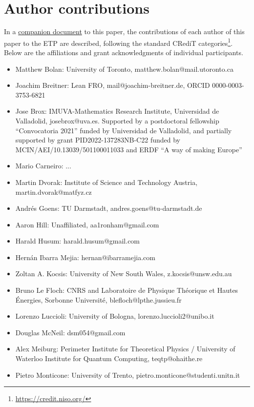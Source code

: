 \section{Author contributions}

In a \href{https://github.com/teorth/equational_theories/blob/main/paper/contributions.md}{companion document} to this paper, the contributions of each author of this paper to the ETP are described, following the standard CRediT categories\footnote{\url{https://credit.niso.org/}}.  Below are the affiliations and grant acknowledgments of individual participants.


\begin{itemize}
    \item Matthew Bolan: University of Toronto, matthew.bolan@mail.utoronto.ca
    \item Joachim Breitner: Lean FRO, mail@joachim-breitner.de, ORCID 0000-0003-3753-6821
    \item Jose Brox: IMUVA-Mathematics Research Institute, Universidad de Valladolid, josebrox@uva.es. Supported by a postdoctoral fellowship “Convocatoria 2021” funded by Universidad de Valladolid, and partially supported by grant PID2022-137283NB-C22 funded by MCIN/AEI/10.13039/501100011033 and ERDF “A way of making Europe”
    \item Mario Carneiro: ...
    \item Martin Dvorak: Institute of Science and Technology Austria, martin.dvorak@matfyz.cz
    \item Andr\'es Goens: TU Darmstadt, andres.goens@tu-darmstadt.de
    \item Aaron Hill: Unaffiliated, aa1ronham@gmail.com
    \item Harald Husum: harald.husum@gmail.com
    \item Hern\'an Ibarra Mejia: hernan@ibarramejia.com
    \item Zoltan A. Kocsis: University of New South Wales, z.kocsis@unsw.edu.au
    \item Bruno Le Floch: CNRS and Laboratoire de Physique Th\'eorique et Hautes \'Energies, Sorbonne Universit\'e, blefloch@lpthe.jussieu.fr
    \item Lorenzo Luccioli: University of Bologna, lorenzo.luccioli2@unibo.it
    \item Douglas McNeil: dsm054@gmail.com
    \item Alex Meiburg: Perimeter Institute for Theoretical Physics / University of Waterloo Institute for Quantum Computing, teqtp@ohaithe.re
    \item Pietro Monticone: University of Trento, pietro.monticone@studenti.unitn.it

\end{itemize}

